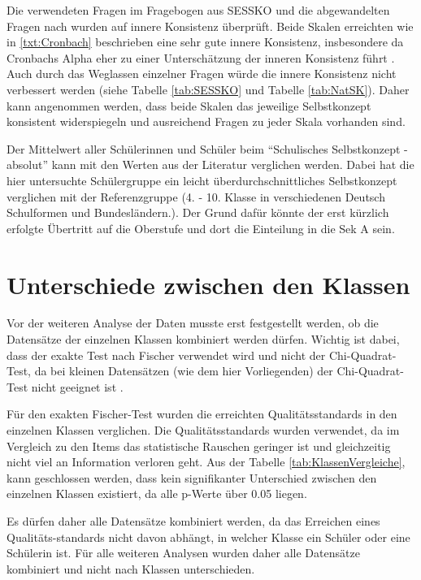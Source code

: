Die verwendeten Fragen im Fragebogen aus SESSKO \citep{Schone2002} und die abgewandelten Fragen nach \citet{Dierks2014} wurden auf innere Konsistenz überprüft. Beide Skalen erreichten wie in \ref{txt:Cronbach} beschrieben eine sehr gute innere Konsistenz, insbesondere da Cronbachs Alpha eher zu einer Unterschätzung der inneren Konsistenz führt \citep{Eisinga2013}. Auch durch das Weglassen einzelner Fragen würde die innere Konsistenz nicht verbessert werden (siehe Tabelle \ref{tab:SESSKO} und Tabelle \ref{tab:NatSK}). Daher kann angenommen werden, dass beide Skalen das jeweilige Selbstkonzept konsistent widerspiegeln und ausreichend Fragen zu jeder Skala vorhanden sind. 

Der Mittelwert aller Schülerinnen und Schüler beim "`Schulisches Selbstkonzept - absolut"' kann mit den Werten aus der Literatur \citep{Schone2002} verglichen werden. Dabei hat die hier untersuchte Schülergruppe ein leicht überdurchschnittliches Selbstkonzept verglichen mit der Referenzgruppe (4. - 10. Klasse in verschiedenen Deutsch Schulformen und Bundesländern.). Der Grund dafür könnte der erst kürzlich erfolgte Übertritt auf die Oberstufe und dort die Einteilung in die Sek A sein. 

\section{Unterschiede zwischen den Klassen}

Vor der weiteren Analyse der Daten musste erst festgestellt werden, ob die Datensätze der einzelnen Klassen kombiniert werden dürfen. Wichtig ist dabei, dass der exakte Test nach Fischer verwendet wird und nicht der Chi-Quadrat-Test, da bei kleinen Datensätzen (wie dem hier Vorliegenden) der Chi-Quadrat-Test nicht geeignet ist \citep{Mehta1984}.

Für den exakten Fischer-Test wurden die erreichten Qualitätsstandards in den einzelnen Klassen verglichen. Die Qualitätsstandards wurden verwendet, da im Vergleich zu den Items das statistische Rauschen geringer ist und gleichzeitig nicht viel an Information verloren geht. Aus der Tabelle \ref{tab:KlassenVergleiche}, kann geschlossen werden, dass kein signifikanter Unterschied zwischen den einzelnen Klassen existiert, da alle p-Werte über 0.05 liegen.

Es dürfen daher alle Datensätze kombiniert werden, da das Erreichen eines Qualitäts-standards nicht davon abhängt, in welcher Klasse ein Schüler oder eine Schülerin ist. Für alle weiteren Analysen wurden daher alle Datensätze kombiniert und nicht nach Klassen unterschieden.

